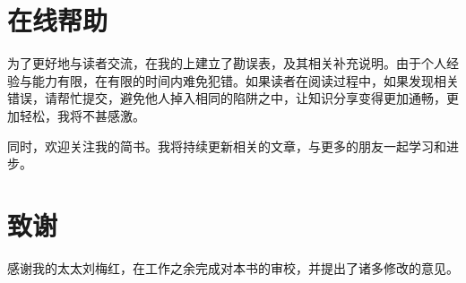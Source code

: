 \section*{在线帮助}

\begin{content}

为了更好地与读者交流，在我的上建立了勘误表，及其相关补充说明。由于个人经验与能力有限，在有限的时间内难免犯错。如果读者在阅读过程中，如果发现相关错误，请帮忙提交，避免他人掉入相同的陷阱之中，让知识分享变得更加通畅，更加轻松，我将不甚感激。

同时，欢迎关注我的简书。我将持续更新相关的文章，与更多的朋友一起学习和进步。

\begin{enum}
\end{enum}

\end{content}

\section*{致谢}

\begin{content}

感谢我的太太刘梅红，在工作之余完成对本书的审校，并提出了诸多修改的意见。

\end{content}

